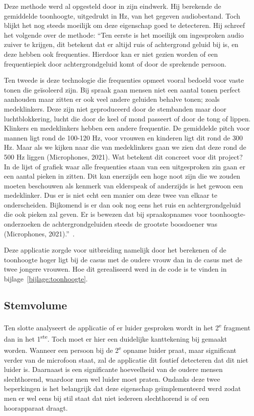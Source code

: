 Deze methode werd al opgesteld door \textcite{Standaert2021} in zijn eindwerk. Hij berekende de gemiddelde toonhoogte, uitgedrukt in Hz, van het gegeven audiobestand. Toch blijkt het nog steeds moeilijk om deze eigenschap goed te detecteren. Hij schreef het volgende over de methode:
``Ten eerste is het moeilijk om ingesproken audio zuiver te krijgen, dit betekent dat er altijd
ruis of achtergrond geluid bij is, en deze hebben ook frequenties. Hierdoor kan er niet
gezien worden of een frequentiepiek door achtergrondgeluid komt of door de sprekende
persoon.

Ten tweede is deze technologie die frequenties opmeet vooral bedoeld voor vaste tonen
die geïsoleerd zijn. Bij spraak gaan mensen niet een aantal tonen perfect aanhouden maar
zitten er ook veel andere geluiden behalve tonen; zoals medeklinkers. Deze zijn niet
geproduceerd door de stembanden maar door luchtblokkering, lucht die door de keel of
mond passeert of door de tong of lippen. Klinkers en medeklinkers hebben een andere
frequentie. De gemiddelde pitch voor mannen ligt rond de 100-120 Hz, voor vrouwen en
kinderen ligt dit rond de 300 Hz. Maar als we kijken naar die van medeklinkers gaan we
zien dat deze rond de 500 Hz liggen (Microphones, 2021). Wat betekent dit concreet voor
dit project? In de lijst of grafiek waar alle frequenties staan van een uitgesproken zin gaan
er een aantal pieken in zitten. Dit kan enerzijds een hoge noot zijn die we zouden moeten
beschouwen als kenmerk van elderspeak of anderzijds is het gewoon een medeklinker. Dus
er is niet echt een manier om deze twee van elkaar te onderscheiden. Bijkomend is er dan
ook nog eens het ruis en achtergrondgeluid die ook pieken zal geven. Er is bewezen dat bij
spraakopnames voor toonhoogte-onderzoeken de achtergrondgeluiden steeds de grootste
boosdoener was (Microphones, 2021).''~\autocite{Standaert2021}.


Deze applicatie zorgde voor uitbreiding namelijk door het berekenen of de toonhoogte hoger ligt bij de casus met de oudere vrouw dan in de casus met de twee jongere vrouwen.
Hoe dit gerealiseerd werd in de code is te vinden in bijlage~\ref{bijlage:toonhoogte}.

\subsection{Stemvolume}
Ten slotte analyseert de applicatie of er luider gesproken wordt in het 2\textsuperscript{e} fragment dan in het 1\textsuperscript{ste}. Toch moet er hier een duidelijke kanttekening bij gemaakt worden. Wanneer een persoon bij de 2\textsuperscript{e} opname luider praat, maar significant verder van de microfoon staat, zal de applicatie dit foutief detecteren  dat dit niet luider is. Daarnaast is een significante hoeveelheid van de oudere mensen slechthorend, waardoor men wel luider moet praten. Ondanks deze twee beperkingen is het belangrijk dat deze eigenschap geïmplementeerd werd zodat men er wel eens bij stil staat dat niet iedereen slechthorend is of een hoorapparaat draagt.


